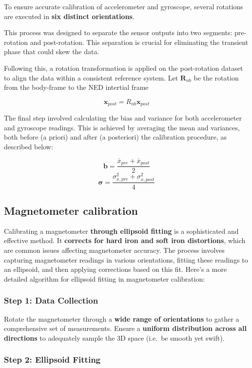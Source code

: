 \documentclass[12pt]{article}
\begin{document}
To ensure accurate calibration of accelerometer and gyroscope, several
rotations are executed in \textbf{six distinct orientations}.

This process was designed to separate the sensor outputs into two
segments: pre-rotation and post-rotation. This separation is crucial for
eliminating the transient phase that could skew the data.

Following this, a rotation transformation is applied on the
post-rotation dataset to align the data within a consistent reference
system. Let \(\boldsymbol R_{nb}\) be the rotation from the body-frame
to the NED intertial frame

\[
\boldsymbol x_{post} = R_{nb}\boldsymbol x_{post}
\]

The final step involved calculating the bias and variance for both
accelerometer and gyroscope readings. This is achieved by averaging the
mean and variances, both before (a priori) and after (a posteriori) the
calibration procedure, as described below:

\[
\boldsymbol b = \frac{\bar x_{pre} + \bar x_{post}}{2}
\] \[
\boldsymbol{\sigma} = \frac{ \sigma_{x,pre}^2 + \sigma_{x,post}^2}{4}
\]

\subsection{Magnetometer calibration}\label{magnetometer-calibration}

Calibrating a magnetometer \textbf{through ellipsoid fitting} is a
sophisticated and effective method. It \textbf{corrects for hard iron
and soft iron distortions}, which are common issues affecting
magnetometer accuracy. The process involves capturing magnetometer
readings in various orientations, fitting these readings to an
ellipsoid, and then applying corrections based on this fit. Here's a
more detailed algorithm for ellipsoid fitting in magnetometer
calibration:

\subsubsection{Step 1: Data Collection}\label{step-1-data-collection}

Rotate the magnetometer through a \textbf{wide range of orientations} to
gather a comprehensive set of measurements. Ensure a \textbf{uniform
distribution across all directions} to adequately sample the 3D space
(i.e.~be smooth yet swift).

\subsubsection{Step 2: Ellipsoid
Fitting}\label{step-2-ellipsoid-fitting}
\end{document}
